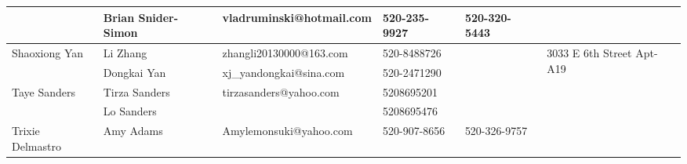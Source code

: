 \documentclass[landscape]{article}\usepackage[]{graphicx}\usepackage[]{color}
\begin{document}
\begin{longtable}{|p{100pt}|p{100pt}|p{140pt}|p{60pt}|p{64pt}|p{120pt}|}
 & Brian Snider-Simon & vladruminski@hotmail.com & 520-235-9927 & 520-320-5443 & \\
\hline
\multirow{2}{100pt}{Shaoxiong Yan} & Li Zhang & zhangli20130000@163.com & 520-8488726 &  & \multirow{2}{120pt}{3033 E 6th Street Apt-A19} \\
 & Dongkai Yan & xj\_yandongkai@sina.com & 520-2471290 &  & \\
\hline
\multirow{2}{100pt}{Taye Sanders} & Tirza Sanders & tirzasanders@yahoo.com & 5208695201 &  & \multirow{2}{120pt}{} \\
 & Lo Sanders &  & 5208695476 &  & \\
\hline
\multirow{2}{100pt}{Trixie Delmastro } & Amy Adams & Amylemonsuki@yahoo.com & 520-907-8656 & 520-326-9757 & \multirow{2}{120pt}{} \\
 &  &  &  &  & \\
\hline
\end{longtable}
\newpage
\end{document}
